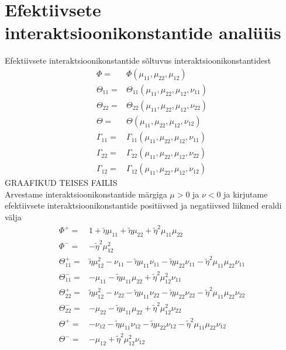 \documentclass[class=article, crop=false]{standalone}
\begin{document}
\section{Efektiivsete interaktsioonikonstantide analüüs}
Efektiivsete interaktsioonikonstantide sõltuvus interaktsioonikonstantidest
\begin{equation}\label{key}
	\begin{split}
		\Phi = & \Phi ( \mu_{11}, \mu_{22}, \mu_{12}) \\
		\Theta_{11} = & \Theta_{11} ( \mu_{11}, \mu_{22}, \mu_{12}, \nu_{11}) \\
		\Theta_{22} = & \Theta_{22} ( \mu_{11}, \mu_{22}, \mu_{12}, \nu_{22}) \\
		\Theta = & \Theta ( \mu_{11}, \mu_{22}, \mu_{12}, \nu_{12}) \\
		\Gamma_{11} = & \Gamma_{11} ( \mu_{11}, \mu_{22}, \mu_{12}, \nu_{11}) \\
		\Gamma_{22} = & \Gamma_{22} ( \mu_{11}, \mu_{22}, \mu_{12}, \nu_{22}) \\
		\Gamma_{12} = & \Gamma_{12} ( \mu_{11}, \mu_{22}, \mu_{12}, \nu_{12})
	\end{split}
\end{equation}
GRAAFIKUD TEISES FAILIS\\
Arvestame interaktsioonikonstantide märgiga $ \mu > 0 $ ja $ \nu < 0 $ ja kirjutame efektiivsete interaktsioonikonstantide positiivsed ja negatiivsed liikmed eraldi välja
\begin{equation}\label{key}
	\begin{split}
		\Phi^{+} = & 1 + \tilde{ \eta} \mu_{11} + \tilde{ \eta} \mu_{22} + \tilde{ \eta}^{2} \mu_{11} \mu_{22} \\
		\Phi^{-} = & - \tilde{ \eta}^{2} \mu_{12}^{2} \\
		\Theta_{11}^{+} = & \tilde{ \eta} \mu_{12}^{2} - \nu_{11} - \tilde{ \eta} \mu_{11} \nu_{11} - \tilde{ \eta} \mu_{22} \nu_{11} - \tilde{ \eta}^{2} \mu_{11} \mu_{22} \nu_{11} \\
		\Theta_{11}^{-} = & - \mu_{11} - \tilde{ \eta} \mu_{11} \mu_{22} + \tilde{ \eta}^{2} \mu_{12}^{2} \nu_{11} \\
		\Theta_{22}^{+} = & \tilde{ \eta} \mu_{12}^{2} - \nu_{22} - \tilde{ \eta} \mu_{11} \nu_{22} - \tilde{ \eta} \mu_{22} \nu_{22} - \tilde{ \eta}^{2} \mu_{11} \mu_{22} \nu_{22} \\
		\Theta_{22}^{-} = & - \mu_{22} - \tilde{ \eta} \mu_{11} \mu_{22}+ \tilde{ \eta}^{2} \mu_{12}^{2} \nu_{22} \\
		\Theta^{+} = & - \nu_{12} - \tilde{ \eta} \mu_{11} \nu_{12} - \tilde{ \eta} \mu_{22} \nu_{12} - \tilde{ \eta}^{2} \mu_{11} \mu_{22} \nu_{12} \\
		\Theta^{-} = & - \mu_{12} + \tilde{ \eta}^{2} \mu_{12}^{2} \nu_{12}
	\end{split}
\end{equation}
\end{document}
